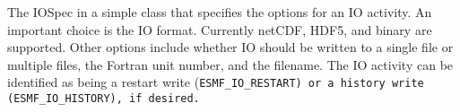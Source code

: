 
The IOSpec in a simple class that specifies the options for 
an IO activity.  An important choice is the IO format.  Currently
 netCDF, HDF5, and binary are supported.  Other options include 
whether IO should be written to a single file or multiple files, 
the Fortran unit number, and the filename.  The IO activity can
be identified as being a restart write (\tt ESMF\_IO\_RESTART) or 
a history write (\tt ESMF\_IO\_HISTORY), if desired.



